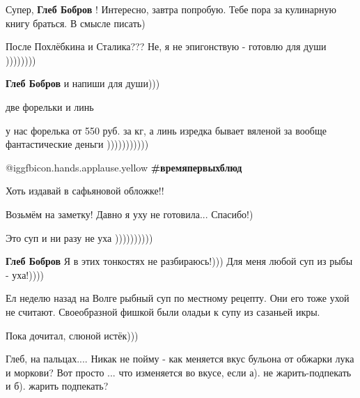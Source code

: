 \begin{itemize}
\begin{itemize}
\end{itemize} %

Супер, \textbf{Глеб Бобров} !
Интересно, завтра попробую. Тебе пора за кулинарную книгу браться. В смысле писать)

\begin{itemize} %
После Похлёбкина и Сталика???
Не, я не эпигонствую - готовлю для души ))))))))

\textbf{Глеб Бобров} и напиши для души)))
\end{itemize} %

две форельки и линь

\begin{itemize} %
у нас форелька от 550 руб. за кг, а линь изредка бывает вяленой за вообще фантастические деньги )))))))))))
\end{itemize} %

 @igg{fbicon.hands.applause.yellow}  \textbf{\#времяпервыхблюд}

Хоть издавай в сафьяновой обложке!!

Возьмём на заметку! Давно я уху не готовила... Спасибо!)

\begin{itemize} %
Это суп и ни разу не уха ))))))))))

\textbf{Глеб Бобров} Я в этих тонкостях не разбираюсь!))) Для меня любой суп из рыбы - уха!))))
\end{itemize} %


Ел неделю назад на Волге рыбный суп по местному рецепту. Они его тоже ухой не
считают. Своеобразной фишкой были оладьи к супу из сазаньей икры.


Пока дочитал, слюной истёк)))


Глеб, на пальцах.... Никак не пойму - как меняется вкус бульона от обжарки лука
и моркови? Вот просто ... что изменяется во вкусе, если а). не жарить-подпекать
и б). жарить подпекать?


\end{itemize} %
